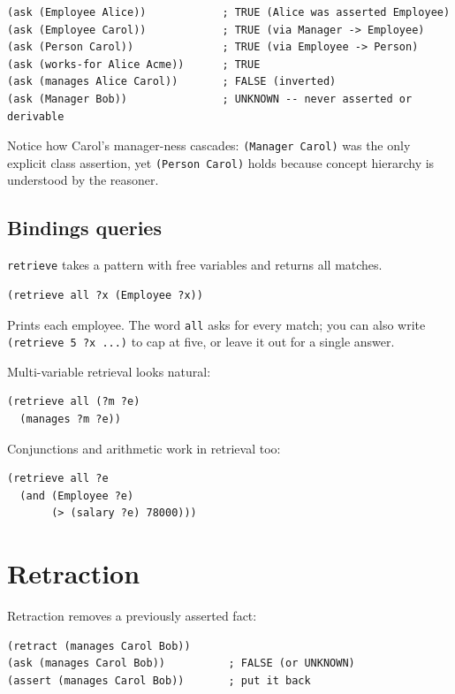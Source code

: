\documentclass[11pt,letterpaper]{article}
\newcommand{\cmd}[1]{\texttt{#1}}
\begin{document}
\begin{lstlisting}
(ask (Employee Alice))            ; TRUE (Alice was asserted Employee)
(ask (Employee Carol))            ; TRUE (via Manager -> Employee)
(ask (Person Carol))              ; TRUE (via Employee -> Person)
(ask (works-for Alice Acme))      ; TRUE
(ask (manages Alice Carol))       ; FALSE (inverted)
(ask (Manager Bob))               ; UNKNOWN -- never asserted or derivable
\end{lstlisting}

\noindent Notice how Carol's manager-ness cascades: \cmd{(Manager Carol)}
was the only explicit class assertion, yet \cmd{(Person Carol)} holds
because concept hierarchy is understood by the reasoner.

\subsection{Bindings queries}

\cmd{retrieve} takes a pattern with free variables and returns all matches.

\begin{lstlisting}
(retrieve all ?x (Employee ?x))
\end{lstlisting}

\noindent Prints each employee. The word \cmd{all} asks for every match; you
can also write \cmd{(retrieve 5 ?x ...)} to cap at five, or leave it out
for a single answer.

Multi-variable retrieval looks natural:

\begin{lstlisting}
(retrieve all (?m ?e)
  (manages ?m ?e))
\end{lstlisting}

\noindent Conjunctions and arithmetic work in retrieval too:

\begin{lstlisting}
(retrieve all ?e
  (and (Employee ?e)
       (> (salary ?e) 78000)))
\end{lstlisting}

\section{Retraction}
\label{sec:retract}

Retraction removes a previously asserted fact:

\begin{lstlisting}
(retract (manages Carol Bob))
(ask (manages Carol Bob))          ; FALSE (or UNKNOWN)
(assert (manages Carol Bob))       ; put it back
\end{lstlisting}
\end{document}

